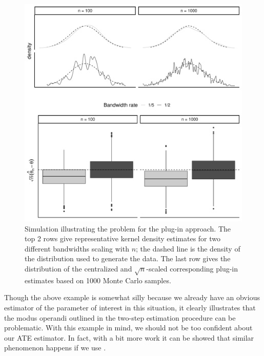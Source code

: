 \documentclass[a4,danish]{article}
\begin{document}
  \begin{figure}[h]
    \centerline{\includegraphics[width=.75\linewidth]{./figures/kernel-undersmooth-viz-presentation-3.pdf}}
    \caption{Simulation illustrating the problem for the plug-in approach. The top 2 rows give
      representative kernel density estimates for two different bandwidths scaling with $n$; the
      dashed line is the density of the distribution used to generate the data. The last row gives
      the distribution of the centralized and $\sqrt{n}$-scaled corresponding plug-in estimates
      based on 1000 Monte Carlo samples.}
    \label{fig:kernel-undersmoothed}
  \end{figure}

  Though the above example is somewhat silly because we already have
  an obvious estimator of the parameter of interest in this situation,
  it clearly illustrates that the modus operandi outlined in the
  two-step estimation procedure can be problematic. With this example
  in mind, we should not be too confident about our ATE estimator. In
  fact, with a bit more work it can be showed that similar phenomenon
  happens if we use .
\end{document}
